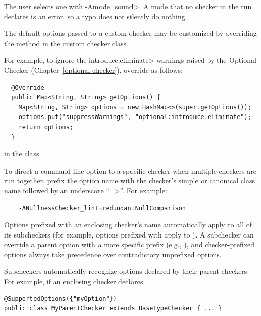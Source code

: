 The user selects one with \<-Amode=sound>.  A mode that no checker in the run declares
is an error, so a typo does not silently do nothing.


The default options passed to a custom checker may be customized by overriding the
 method in the
custom checker class.

For example, to ignore the \<introduce.eliminate> warnings raised by the
Optional Checker (Chapter~\ref{optional-checker}), override
 as follows:

\begin{Verbatim}
  @Override
  public Map<String, String> getOptions() {
    Map<String, String> options = new HashMap<>(super.getOptions());
    options.put("suppressWarnings", "optional:introduce.eliminate");
    return options;
  }
\end{Verbatim}

in the  class.


To direct a command-line option to a specific checker when multiple checkers are run together,
prefix the option name with the checker's simple or canonical class name followed by an underscore
``\<\_>''.
For example:
\begin{Verbatim}
    -ANullnessChecker_lint=redundantNullComparison
\end{Verbatim}

\noindent
Options prefixed with an enclosing checker's name automatically apply to all of its subcheckers
(for example, options prefixed with  apply to ).
A subchecker can override a parent option with a more specific prefix
(e.g., ),
and checker-prefixed options always take precedence over contradictory unprefixed options.

Subcheckers automatically recognize options declared by their parent checkers.
For example, if an enclosing checker declares:
\begin{Verbatim}
@SupportedOptions({"myOption"})
public class MyParentChecker extends BaseTypeChecker { ... }
\end{Verbatim}

